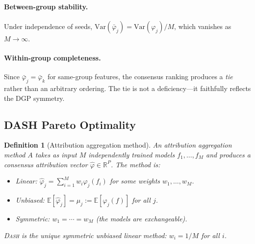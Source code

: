 \documentclass{article}
\newtheorem{definition}[theorem]{Definition}
\newcommand{\R}{\mathbb{R}}
\newcommand{\E}{\mathbb{E}}
\newcommand{\Var}{\mathrm{Var}}
\newcommand{\DASH}{\textsc{Dash}}
\begin{document}
\paragraph{Between-group stability.}
Under independence of seeds, $\Var(\bar{\varphi}_j) = \Var(\varphi_j) / M$, which vanishes as $M \to \infty$.

\paragraph{Within-group completeness.}
Since $\bar{\varphi}_j = \bar{\varphi}_k$ for same-group features, the consensus ranking produces a \emph{tie} rather than an arbitrary ordering. The tie is not a deficiency---it faithfully reflects the DGP symmetry.

\subsection{DASH Pareto Optimality}
\label{sec:dash-pareto}

\begin{definition}[Attribution aggregation method]
An \emph{attribution aggregation method} $A$ takes as input $M$ independently trained models $f_1, \ldots, f_M$ and produces a consensus attribution vector $\hat\varphi \in \R^P$. The method is:
\begin{itemize}
    \item \emph{Linear}: $\hat\varphi_j = \sum_{i=1}^M w_i \varphi_j(f_i)$ for some weights $w_1, \ldots, w_M$.
    \item \emph{Unbiased}: $\E[\hat\varphi_j] = \mu_j := \E[\varphi_j(f)]$ for all $j$.
    \item \emph{Symmetric}: $w_1 = \cdots = w_M$ (the models are exchangeable).
\end{itemize}
\DASH{} is the unique symmetric unbiased linear method: $w_i = 1/M$ for all $i$.
\end{definition}
\end{document}
